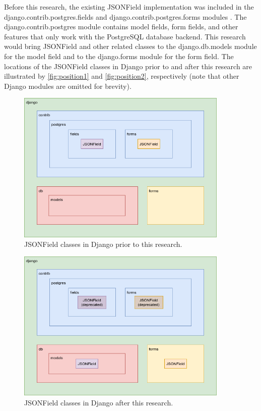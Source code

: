 Before this research, the existing JSONField implementation was included in the
django.contrib.postgres.fields and django.contrib.postgres.forms modules
\cite{django30_modeljsonfield} \cite{django30_formjsonfield}. The
django.contrib.postgres module contains model fields, form fields, and other
features that only work with the PostgreSQL database backend. This research
would bring JSONField and other related classes to the django.db.models
module for the model field and to the django.forms module for the form field.
The locations of the JSONField classes in Django prior to and after this
research are illustrated by \autoref{fig:position1} and
\autoref{fig:position2}, respectively (note that other Django modules are
omitted for brevity).

\begin{figure}
	\centering
    \includegraphics[width=0.90\textwidth]{pics/position1.png}
	\caption{JSONField classes in Django prior to this research.}
	\label{fig:position1}
\end{figure}

\begin{figure}
	\centering
    \includegraphics[width=0.90\textwidth]{pics/position2.png}
	\caption{JSONField classes in Django after this research.}
	\label{fig:position2}
\end{figure}

